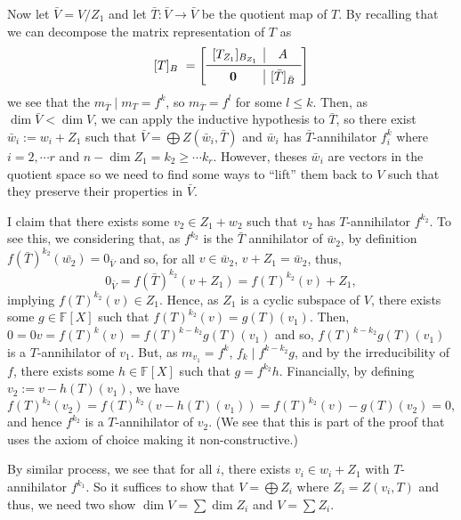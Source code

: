 \documentclass[
]{article}
\theoremstyle{definition}
\begin{document}
Now let \(\bar{V} = V / Z_1\) and let \(\bar{T} : \bar{V} \to \bar{V}\)
be the quotient map of \(T\). By recalling that we can decompose the
matrix representation of \(T\) as \[[T]_B = 
    \left[
      \begin{array}{c|c}
        [T_{Z_1}]_{B_{Z_1}} & A \\
        \midrule
        \mathbf{0} & [\bar{T}]_{\bar{B}}
      \end{array}
    \right]\] we see that the \(m_{\bar{T}} \mid m_{T} = f^k\), so
\(m_{\bar{T}} = f^l\) for some \(l \le k\). Then, as
\(\dim \bar{V} < \dim V\), we can apply the inductive hypothesis to
\(\bar{T}\), so there exist \(\bar{w}_i := w_i + Z_1\) such that
\(\bar{V} = \bigoplus Z(\bar{w}_i, \bar{T})\) and \(\bar{w}_i\) has
\(\bar{T}\)-annihilator \(f^k_i\) where \(i = 2, \cdots r\) and
\(n - \dim Z_1 = k_2 \ge \cdots k_r\). However, theses \(\bar{w}_i\) are
vectors in the quotient space so we need to find some ways to ``lift''
them back to \(V\) such that they preserve their properties in
\(\bar{V}\).

I claim that there exists some \(v_2 \in Z_1 + w_2\) such that \(v_2\)
has \(T\)-annihilator \(f^{k_2}\). To see this, we considering that, as
\(f^{k_2}\) is the \(\bar{T}\) annihilator of \(\bar{w}_2\), by
definition \(f(\bar{T})^{k_2}(\bar{w_2}) = 0_{\bar{V}}\) and so, for all
\(v \in \bar{w}_2\), \(v + Z_1 = \bar{w}_2\), thus,
\[0_{\bar{V}} = f(\bar{T})^{k_2}(v + Z_1) = f(T)^{k_2}(v) + Z_1,\]
implying \(f(T)^{k_2}(v) \in Z_1\). Hence, as \(Z_1\) is a cyclic
subspace of \(V\), there exists some \(g \in \mathbb{F}[X]\) such that
\(f(T)^{k_2}(v) = g(T)(v_1)\). Then,
\(0 = 0 v = f(T)^k (v) = f(T)^{k - k_2}g(T)(v_1)\) and so,
\(f(T)^{k - k_2}g(T)(v_1)\) is a \(T\)-annihilator of \(v_1\). But, as
\(m_{v_1} = f^k\), \(f_k \mid f^{k - k_2}g\), and by the irreducibility
of \(f\), there exists some \(h \in \mathbb{F}[X]\) such that
\(g = f^{k_2} h\). Financially, by defining \(v_2 := v - h(T)(v_1)\), we
have
\[f(T)^{k_2}(v_2) = f(T)^{k_2}(v - h(T)(v_1)) = f(T)^{k_2}(v) - g(T)(v_2) = 0,\]
and hence \(f^{k_2}\) is a \(T\)-annihilator of \(v_2\). (We see that
this is part of the proof that uses the axiom of choice making it
non-constructive.)

By similar process, we see that for all \(i\), there exists
\(v_i \in w_i + Z_1\) with \(T\)-annihilator \(f^{k_1}\). So it suffices
to show that \(V = \bigoplus Z_i\) where \(Z_i = Z(v_i, T)\) and thus,
we need two show \(\dim V = \sum \dim Z_i\) and \(V = \sum Z_i\).
\end{document}
